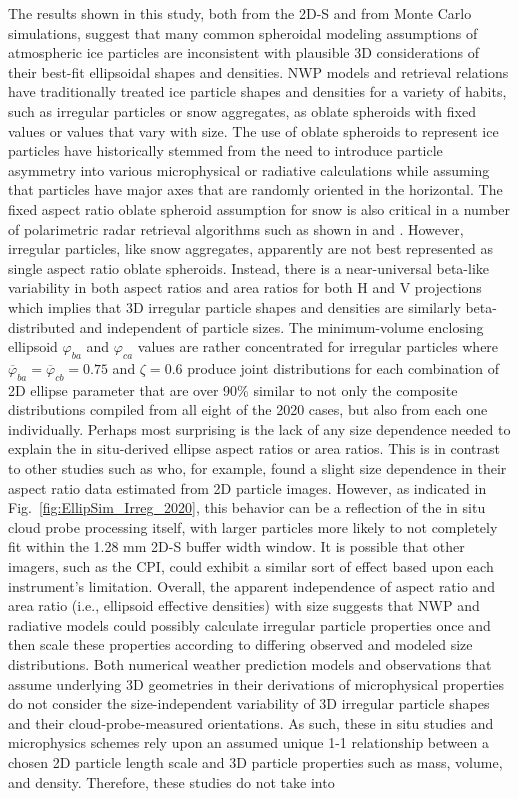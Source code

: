 \documentclass[amt, manuscript]{copernicus}
\begin{document}
The results shown in this study, both from the 2D-S and from Monte Carlo simulations, suggest that many common spheroidal modeling assumptions of atmospheric ice particles are inconsistent with plausible 3D considerations of their best-fit ellipsoidal shapes and densities. NWP models and retrieval relations have traditionally treated ice particle shapes and densities for a variety of habits, such as irregular particles or snow aggregates, as oblate spheroids with fixed values or values that vary with size. The use of oblate spheroids to represent ice particles have historically stemmed from the need to introduce particle asymmetry into various microphysical or radiative calculations while assuming that particles have major axes that are randomly oriented in the horizontal. The fixed aspect ratio oblate spheroid assumption for snow is also critical in a number of polarimetric radar retrieval algorithms such as shown in \citet{Bukovcic2020} and \citet{Dunnavan2022}. However, irregular particles, like snow aggregates, apparently are not best represented as single aspect ratio oblate spheroids. Instead, there is a near-universal beta-like variability in both aspect ratios and area ratios for both H and V projections which implies that 3D irregular particle shapes and densities are similarly beta-distributed and independent of particle sizes. The minimum-volume enclosing ellipsoid $\varphi_{ba}$ and $\varphi_{ca}$ values are rather concentrated for irregular particles where $\overline{\varphi}_{ba}= \overline{\varphi}_{cb}=0.75$ and $\zeta = 0.6$ produce joint distributions for each combination of 2D ellipse parameter that are over 90\% similar to not only the composite distributions compiled from all eight of the 2020 cases, but also from each one individually. Perhaps most surprising is the lack of any size dependence needed to explain the in situ-derived ellipse aspect ratios or area ratios. This is in contrast to other studies such as \citet{Korolev2003} who, for example, found a slight size dependence in their aspect ratio data estimated from 2D particle images. However, as indicated in Fig.~\ref{fig:EllipSim_Irreg_2020}, this behavior can be a reflection of the in situ cloud probe processing itself, with larger particles more likely to not completely fit within the 1.28 mm 2D-S buffer width window. It is possible that other imagers, such as the CPI, could exhibit a similar sort of effect based upon each instrument's limitation. Overall, the apparent independence of aspect ratio and area ratio (i.e., ellipsoid effective densities) with size suggests that NWP and radiative models could possibly calculate irregular particle properties once and then scale these properties according to differing observed and modeled size distributions. Both numerical weather prediction models and observations that assume underlying 3D geometries in their derivations of microphysical properties \citep[e.g.,][]{Heymsfield2004} do not consider the size-independent variability of 3D irregular particle shapes and their cloud-probe-measured orientations. As such, these in situ studies and microphysics schemes rely upon an assumed unique 1-1 relationship between a chosen 2D particle length scale and 3D particle properties such as mass, volume, and density. Therefore, these studies do not take into 
\end{document}
